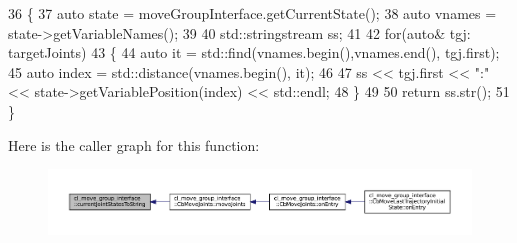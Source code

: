 \begin{DoxyCode}
36   \{
37     \textcolor{keyword}{auto} state = moveGroupInterface.getCurrentState();
38     \textcolor{keyword}{auto} vnames = state->getVariableNames();
39     
40     std::stringstream ss;
41 
42     \textcolor{keywordflow}{for}(\textcolor{keyword}{auto}& tgj: targetJoints)
43     \{
44       \textcolor{keyword}{auto} it = std::find(vnames.begin(),vnames.end(), tgj.first);
45       \textcolor{keyword}{auto} index = std::distance(vnames.begin(), it);
46 
47       ss << tgj.first << \textcolor{stringliteral}{":"} << state->getVariablePosition(index) << std::endl;
48     \}
49 
50     \textcolor{keywordflow}{return} ss.str();
51   \}
\end{DoxyCode}
Here is the caller graph for this function\+:
\nopagebreak
\begin{figure}[H]
\begin{center}
\leavevmode
\includegraphics[width=350pt]{namespacecl__move__group__interface_aad71400738b3e25d9fa9ac924670de5d_icgraph}
\end{center}
\end{figure}
